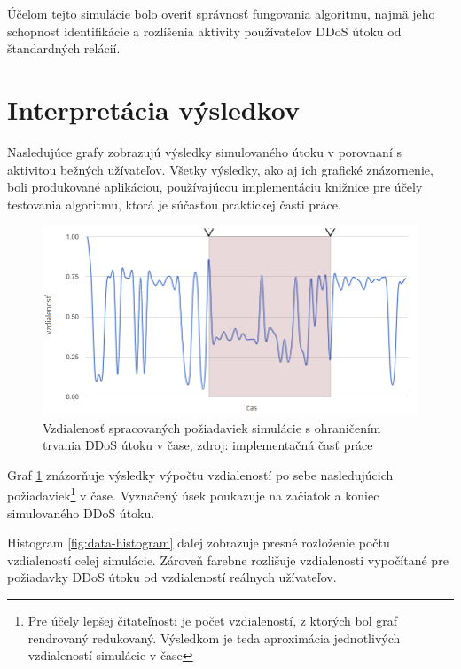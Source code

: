 \documentclass[
  printed, %
  table,   %
  lof,     %
  nolot,   %
  nocover
]{fithesis3}
\begin{document}
Účelom tejto simulácie bolo overiť správnosť fungovania algoritmu, najmä jeho
schopnosť identifikácie a rozlíšenia aktivity používateľov DDoS útoku od
štandardných relácií.

\section{Interpretácia výsledkov}
Nasledujúce grafy zobrazujú výsledky simulovaného útoku v porovnaní s aktivitou
bežných užívateľov. Všetky výsledky, ako aj ich grafické znázornenie, boli
produkované aplikáciou, používajúcou implementáciu knižnice pre účely testovania
algoritmu, ktorá je súčasťou praktickej časti práce.

\begin{figure}[H]
  \centering
    \includegraphics[width=.94\textwidth]{images/data-flow-new.png}
  \caption{Vzdialenosť spracovaných požiadaviek simulácie s ohraničením trvania
  DDoS útoku v čase, zdroj: implementačná časť práce}
  \label{fig:data-flow}
\end{figure}

Graf \ref{fig:data-flow} znázorňuje výsledky výpočtu vzdialeností po sebe nasledujúcich
požiadaviek\footnote{Pre účely lepšej čitateľnosti je počet vzdialeností, z
ktorých bol graf rendrovaný redukovaný. Výsledkom je teda aproximácia
jednotlivých vzdialeností simulácie v čase} v čase. Vyznačený úsek poukazuje na
začiatok a koniec simulovaného DDoS útoku.

Histogram \ref{fig:data-histogram} ďalej zobrazuje presné rozloženie počtu
vzdialeností celej simulácie. Zároveň farebne rozlišuje vzdialenosti vypočítané
pre požiadavky DDoS útoku od vzdialeností reálnych užívateľov. 
\end{document}
